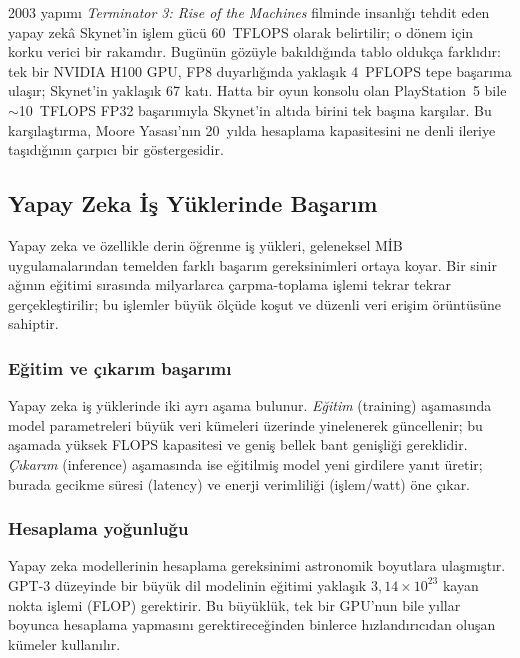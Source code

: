 \begin{bilginot}
2003 yapımı \emph{Terminator 3: Rise of the Machines} filminde insanlığı tehdit eden yapay zekâ Skynet'in işlem gücü 60~TFLOPS olarak belirtilir; o dönem için korku verici bir rakamdır. Bugünün gözüyle bakıldığında tablo oldukça farklıdır: tek bir NVIDIA H100 GPU, FP8 duyarlığında yaklaşık 4~PFLOPS tepe başarıma ulaşır; Skynet'in yaklaşık 67 katı. Hatta bir oyun konsolu olan PlayStation~5 bile $\sim$10~TFLOPS FP32 başarımıyla Skynet'in altıda birini tek başına karşılar. Bu karşılaştırma, Moore Yasası'nın 20~yılda hesaplama kapasitesini ne denli ileriye taşıdığının çarpıcı bir göstergesidir.
\end{bilginot}

\subsection{Yapay Zeka İş Yüklerinde Başarım}
\label{subsec:yz-basarim}

Yapay zeka ve özellikle derin öğrenme iş yükleri, geleneksel MİB uygulamalarından temelden farklı başarım gereksinimleri ortaya koyar. Bir sinir ağının eğitimi sırasında milyarlarca çarpma-toplama işlemi tekrar tekrar gerçekleştirilir; bu işlemler büyük ölçüde koşut ve düzenli veri erişim örüntüsüne sahiptir.

\subsubsection*{Eğitim ve çıkarım başarımı}
Yapay zeka iş yüklerinde iki ayrı aşama bulunur. \emph{Eğitim} (training) aşamasında model parametreleri büyük veri kümeleri üzerinde yinelenerek güncellenir; bu aşamada yüksek FLOPS kapasitesi ve geniş bellek bant genişliği gereklidir. \emph{Çıkarım} (inference) aşamasında ise eğitilmiş model yeni girdilere yanıt üretir; burada gecikme süresi (latency) ve enerji verimliliği (işlem/watt) öne çıkar.

\subsubsection*{Hesaplama yoğunluğu}
Yapay zeka modellerinin hesaplama gereksinimi astronomik boyutlara ulaşmıştır. GPT-3 düzeyinde bir büyük dil modelinin eğitimi yaklaşık $3{,}14 \times 10^{23}$ kayan nokta işlemi (FLOP) gerektirir. Bu büyüklük, tek bir GPU'nun bile yıllar boyunca hesaplama yapmasını gerektireceğinden binlerce hızlandırıcıdan oluşan kümeler kullanılır.

